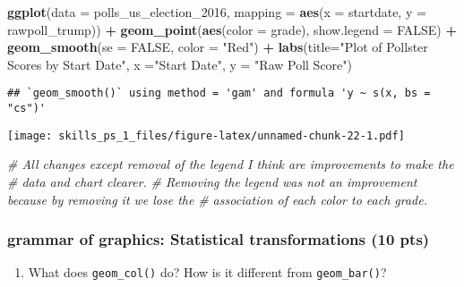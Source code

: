 \documentclass[
]{article}
\newenvironment{Shaded}{\begin{snugshade}}{\end{snugshade}}
\newcommand{\CommentTok}[1]{\textcolor[rgb]{0.56,0.35,0.01}{\textit{#1}}}
\newcommand{\DataTypeTok}[1]{\textcolor[rgb]{0.13,0.29,0.53}{#1}}
\newcommand{\DecValTok}[1]{\textcolor[rgb]{0.00,0.00,0.81}{#1}}
\newcommand{\KeywordTok}[1]{\textcolor[rgb]{0.13,0.29,0.53}{\textbf{#1}}}
\newcommand{\NormalTok}[1]{#1}
\newcommand{\OperatorTok}[1]{\textcolor[rgb]{0.81,0.36,0.00}{\textbf{#1}}}
\newcommand{\OtherTok}[1]{\textcolor[rgb]{0.56,0.35,0.01}{#1}}
\newcommand{\StringTok}[1]{\textcolor[rgb]{0.31,0.60,0.02}{#1}}
\providecommand{\tightlist}{%
  \setlength{\itemsep}{0pt}\setlength{\parskip}{0pt}}
\begin{document}
\begin{Shaded}
\begin{Highlighting}[]
    \KeywordTok{ggplot}\NormalTok{(}\DataTypeTok{data =}\NormalTok{ polls_us_election_}\DecValTok{2016}\NormalTok{, }
           \DataTypeTok{mapping =} \KeywordTok{aes}\NormalTok{(}\DataTypeTok{x =}\NormalTok{ startdate, }
                         \DataTypeTok{y =}\NormalTok{ rawpoll_trump)) }\OperatorTok{+}
\StringTok{        }\KeywordTok{geom_point}\NormalTok{(}\KeywordTok{aes}\NormalTok{(}\DataTypeTok{color =}\NormalTok{ grade), }\DataTypeTok{show.legend =} \OtherTok{FALSE}\NormalTok{) }\OperatorTok{+}
\StringTok{        }\KeywordTok{geom_smooth}\NormalTok{(}\DataTypeTok{se =} \OtherTok{FALSE}\NormalTok{, }\DataTypeTok{color =} \StringTok{"Red"}\NormalTok{) }\OperatorTok{+}\StringTok{ }\KeywordTok{labs}\NormalTok{(}\DataTypeTok{title=}\StringTok{"Plot of Pollster }
\StringTok{                                                      Scores by Start Date"}\NormalTok{,}
        \DataTypeTok{x =}\StringTok{"Start Date"}\NormalTok{, }\DataTypeTok{y =} \StringTok{"Raw Poll Score"}\NormalTok{)}
\end{Highlighting}
\end{Shaded}

\begin{verbatim}
## `geom_smooth()` using method = 'gam' and formula 'y ~ s(x, bs = "cs")'
\end{verbatim}

\texttt{[image: skills\_ps\_1\_files/figure-latex/unnamed-chunk-22-1.pdf]}

\begin{Shaded}
\begin{Highlighting}[]
\CommentTok{# All changes except removal of the legend I think are improvements to make the }
\CommentTok{# data and chart clearer.}
\CommentTok{# Removing the legend was not an improvement because by removing it we lose the }
\CommentTok{# association of each color to each grade.}
\end{Highlighting}
\end{Shaded}

\hypertarget{grammar-of-graphics-statistical-transformations-10-pts}{%
\subsubsection{grammar of graphics: Statistical transformations (10
pts)}\label{grammar-of-graphics-statistical-transformations-10-pts}}

\begin{enumerate}
\def\labelenumi{\arabic{enumi}.}
\tightlist
\item
  What does \texttt{geom\_col()} do? How is it different from
  \texttt{geom\_bar()}?
\end{enumerate}
\end{document}
